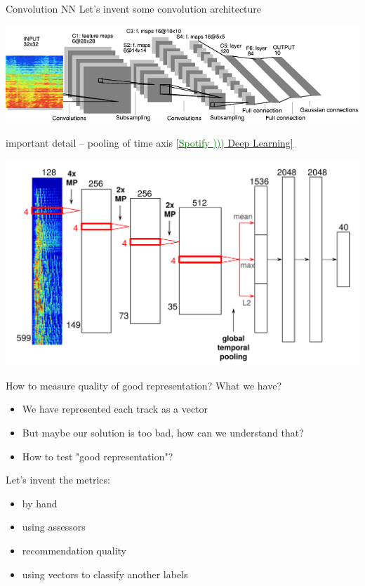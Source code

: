 \documentclass{beamer}
\begin{document}
\begin{frame}{Convolution NN} 
	   Let's invent some convolution architecture
	\begin{center}
		   \includegraphics[scale=0.5]{img/conv}
	\end{center}
	   important detail -- pooling of time axis \href{http://bit.ly/1slJTgi}{[\textcolor{green}{Spotify )))} Deep Learning]}
	\begin{center}				
		   \includegraphics[scale=1.5]{img/rconv}
	\end{center}
\end{frame}

\begin{frame}{How to measure quality of good representation?} 
	   What we have?
	\begin{itemize}
		\item      We have represented each track as a vector
		\item      But maybe our solution is too bad, how can we understand that?
		\item      How to test "good representation"?
	\end{itemize}
	
	   Let's invent the metrics:
	\begin{itemize}
		\item      by hand
		\item      using assessors
		\item      recommendation quality 
		\item      using vectors to classify another labels
	\end{itemize}
\end{frame}
\end{document}
